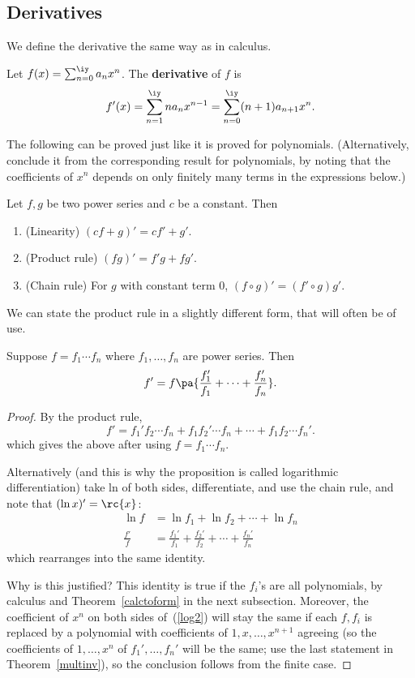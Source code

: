 \subsection{Derivatives}
We define the derivative the same way as in calculus.
\begin{df}
Let $f(x)=\sum_{n=0}^{\iy} a_nx^n$. The \textbf{derivative} of $f$ is 
\[
f'(x)=\sum_{n=1}^{\iy} na_nx^{n-1}=\sum_{n=0}^{\iy} (n+1)a_{n+1}x^n.
\]
\end{df}
The following can be proved just like it is proved for polynomials. (Alternatively, conclude it from the corresponding result for polynomials, by noting that the coefficients of $x^n$ depends on only finitely many terms in the expressions below.)
\begin{pr}
Let $f,g$ be two power series and $c$ be a constant. Then
\begin{enumerate}
\item (Linearity) 
$(cf+g)'=cf'+g'$.
\item (Product rule)
$(fg)'=f'g+fg'$.
\item (Chain rule) For $g$ with constant term 0, 
$(f\circ g)'=(f'\circ g)g'$.
\end{enumerate}
\end{pr}
We can state the product rule in a slightly different form, that will often be of use.
\begin{pr}\label{logdiff}
Suppose $f=f_1\cdots f_n$ where $f_1,\ldots, f_n$ are power series. Then
\[
f'=f\pa{\frac{f_1'}{f_1}+\cdots +\frac{f_n'}{f_n}}.
\]
\end{pr}
\begin{proof}
By the product rule,
\[f'=f_1'f_2\cdots f_n+f_1f_2'\cdots f_n+\cdots +f_1f_2\cdots f_n'.\]
which gives the above after using $f=f_1\cdots f_n$.

Alternatively (and this is why the proposition is called logarithmic differentiation) take ln of both sides, differentiate, and use the chain rule, and note that $(\ln x)'=\rc{x}$:
\begin{align}
\nonumber \ln f&=\ln f_1+\ln f_2+\cdots +\ln f_n\\
\label{log2} \frac{f'}{f}&=\frac{f_1'}{f_1}+\frac{f_2'}{f_2}+\cdots +\frac{f_n'}{f_n}
\end{align}
which rearranges into the same identity.

Why is this justified? This identity is true if the $f_i$'s are all polynomials, by calculus and Theorem~\ref{calctoform} in the next subsection. Moreover, the coefficient of $x^n$ on both sides of~(\ref{log2}) will stay the same if each $f,f_i$ is replaced by a polynomial with coefficients of $1,x,\ldots, x^{n+1}$ agreeing (so the coefficients of $1,\ldots, x^n$ of $f_1',\ldots, f_n'$ will be the same; use the last statement in Theorem~\ref{multinv}), so the conclusion follows from the finite case.
\end{proof}
